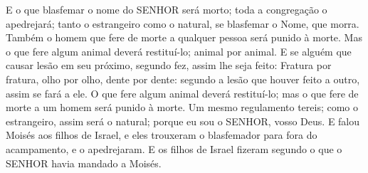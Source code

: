 {{  E o que blasfemar o nome do SENHOR será morto; toda a congregação o apedrejará; tanto o estrangeiro como o natural, se blasfemar o Nome, que morra.
  Também o homem que fere de morte a qualquer pessoa será punido à morte.
  Mas o que fere algum animal deverá restituí-lo; animal por animal.
  E se alguém que causar lesão em seu próximo, segundo fez, assim lhe seja feito:
  Fratura por fratura, olho por olho, dente por dente: segundo a lesão que houver feito a outro, assim se fará a ele.
  O que fere algum animal deverá restituí-lo; mas o que fere de morte a um homem será punido à morte.
  Um mesmo regulamento tereis; como o estrangeiro, assim será o natural; porque eu sou o SENHOR, vosso Deus}.
  E falou Moisés aos filhos de Israel, e eles trouxeram o blasfemador para fora do acampamento, e o apedrejaram. E os filhos de Israel fizeram segundo o que o SENHOR havia mandado a Moisés.
\par }

